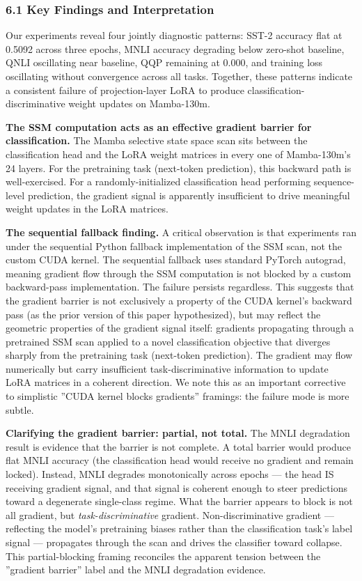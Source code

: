 
\subsubsection{6.1 Key Findings and Interpretation}

Our experiments reveal four jointly diagnostic patterns: SST-2 accuracy flat at 0.5092 across three epochs, MNLI accuracy degrading below zero-shot baseline, QNLI oscillating near baseline, QQP remaining at 0.000, and training loss oscillating without convergence across all tasks. Together, these patterns indicate a consistent failure of projection-layer LoRA to produce classification-discriminative weight updates on Mamba-130m.

\textbf{The SSM computation acts as an effective gradient barrier for classification.} The Mamba selective state space scan sits between the classification head and the LoRA weight matrices in every one of Mamba-130m's 24 layers. For the pretraining task (next-token prediction), this backward path is well-exercised. For a randomly-initialized classification head performing sequence-level prediction, the gradient signal is apparently insufficient to drive meaningful weight updates in the LoRA matrices.

\textbf{The sequential fallback finding.} A critical observation is that experiments ran under the sequential Python fallback implementation of the SSM scan, not the custom CUDA kernel. The sequential fallback uses standard PyTorch autograd, meaning gradient flow through the SSM computation is not blocked by a custom backward-pass implementation. The failure persists regardless. This suggests that the gradient barrier is not exclusively a property of the CUDA kernel's backward pass (as the prior version of this paper hypothesized), but may reflect the geometric properties of the gradient signal itself: gradients propagating through a pretrained SSM scan applied to a novel classification objective that diverges sharply from the pretraining task (next-token prediction). The gradient may flow numerically but carry insufficient task-discriminative information to update LoRA matrices in a coherent direction. We note this as an important corrective to simplistic ''CUDA kernel blocks gradients'' framings: the failure mode is more subtle.

\textbf{Clarifying the gradient barrier: partial, not total.} The MNLI degradation result is evidence that the barrier is not complete. A total barrier would produce flat MNLI accuracy (the classification head would receive no gradient and remain locked). Instead, MNLI degrades monotonically across epochs --- the head IS receiving gradient signal, and that signal is coherent enough to steer predictions toward a degenerate single-class regime. What the barrier appears to block is not all gradient, but \textit{task-discriminative} gradient. Non-discriminative gradient --- reflecting the model's pretraining biases rather than the classification task's label signal --- propagates through the scan and drives the classifier toward collapse. This partial-blocking framing reconciles the apparent tension between the ''gradient barrier'' label and the MNLI degradation evidence.

